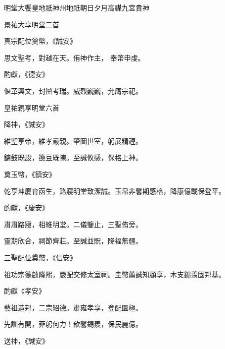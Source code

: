 
\begin{pinyinscope}

 明堂大饗皇地祇神州地祇朝日夕月高禖九宮貴神



 景祐大享明堂二首



 真宗配位奠幣，《誠安》



 思文聖考，對越在天。侑神作主，
 奉幣申虔。



 酌獻，《德安》



 偃革興文，封巒考瑞。威烈巍巍，允膺宗祀。



 皇祐親享明堂六首



 降神，《誠安》



 維聖享帝，維孝嚴親。肇圖世室，躬展精禋。



 鏞鼓既設，籩豆既陳。至誠攸感，保格上神。



 奠玉幣，《鎮安》



 乾亨坤慶育函生，路寢明堂致潔誠。玉帛非馨期感格，降康億載保登平。



 酌獻，《慶安》



 肅肅路寢，相維明堂。二儀鑒止，三聖侑旁。



 靈期欣合，祠節齊莊。至誠並貺，降福無疆。



 三聖配位奠幣，《信安》



 祖功宗德啟隆熙，嚴配交修太室祠。圭幣薦誠知顧享，木支錫羨固邦基。



 酌獻《孝安》



 藝祖造邦，二宗紹德。肅雍孝享，登配圜極。



 先訓有開，菲躬何力！歆馨錫羨，保民麗億。



 送神，《誠安》




\end{pinyinscope}
